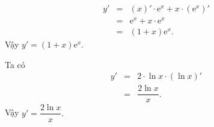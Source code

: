 \begin{bt}
{\begin{listEX}
			\begin{eqnarray*}
				y'&=&\left( x\right)' \cdot \mathrm{e}^x + x \cdot \left( \mathrm{e}^x\right) '\\
				&=& \mathrm{e}^x + x \cdot \mathrm{e}^x \\
				&=&\left( 1+x\right) \mathrm{e}^x.
			\end{eqnarray*}
			Vậy $y'=\left( 1+x\right) \mathrm{e}^x.$
			\item[f)] Ta có 
			\allowdisplaybreaks
			\begin{eqnarray*}
				y'&=&2\cdot \ln x \cdot \left(\ln x \right)' \\
				&=& \dfrac{2 \ln x}{x}.
			\end{eqnarray*}
			Vậy $y'=\dfrac{2 \ln x}{x}.$
	\end{listEX}}
\end{bt}


